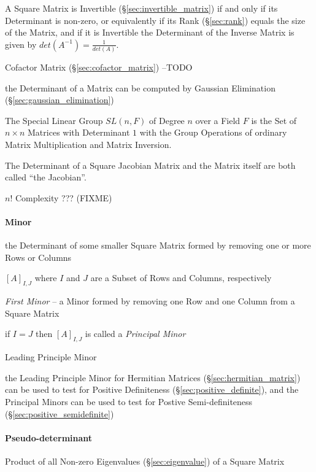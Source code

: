 A Square Matrix is Invertible (\S\ref{sec:invertible_matrix}) if and only if
its Determinant is non-zero, or equivalently if its Rank (\S\ref{sec:rank})
equals the size of the Matrix, and if it is Invertible the Determinant of the
Inverse Matrix is given by $det(A^{-1}) = \frac{1}{det(A)}$.

Cofactor Matrix (\S\ref{sec:cofactor_matrix}) --TODO

\fist the Determinant of a Matrix can be computed by Gaussian Elimination
(\S\ref{sec:gaussian_elimination})

The Special Linear Group $SL(n,F)$ of Degree $n$ over a Field $F$ is the Set of
$n \times n$ Matrices with Determinant $1$ with the Group Operations of
ordinary Matrix Multiplication and Matrix Inversion.

The Determinant of a Square Jacobian Matrix and the Matrix itself are both
called ``the Jacobian''.

$n!$ Complexity ??? (FIXME)



\paragraph{Minor}\label{sec:minor}\hfill

the Determinant of some smaller Square Matrix formed by removing one or more
Rows or Columns

$[A]_{I,J}$ where $I$ and $J$ are a Subset of Rows and Columns, respectively

\emph{First Minor} -- a Minor formed by removing one Row and one Column from a
Square Matrix

if $I = J$ then $[A]_{I,J}$ is called a \emph{Principal Minor}

Leading Principle Minor

the Leading Principle Minor for Hermitian Matrices
(\S\ref{sec:hermitian_matrix}) can be used to test for Positive Definiteness
(\S\ref{sec:positive_definite}), and the Principal Minors can be used to test
for Postive Semi-definiteness (\S\ref{sec:positive_semidefinite})



\paragraph{Pseudo-determinant}\label{sec:pseudo_determinant}\hfill

Product of all Non-zero Eigenvalues (\S\ref{sec:eigenvalue}) of a Square Matrix

